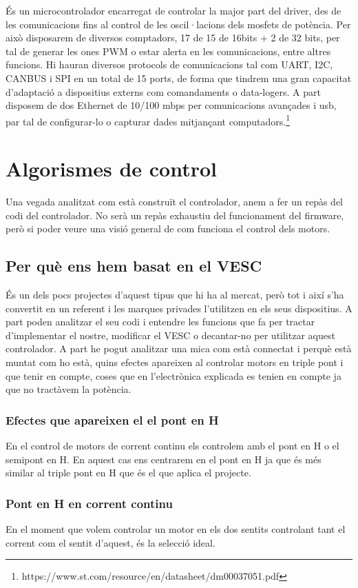 És un microcontrolador encarregat de controlar la major part del driver, des de les comunicacions fins al control de les oscil·lacions dels mosfets de potència. Per això disposarem de diversos comptadors, 17 de 15 de 16bits + 2 de 32 bits, per tal de generar les ones PWM o estar alerta en les comunicacions, entre altres funcions. Hi hauran diversos protocols de comunicacions tal com UART, I2C, CANBUS i SPI en un total de 15 ports, de forma que tindrem una gran capacitat d'adaptació a dispositius externs com comandaments o data-logers. A part disposem de dos Ethernet de 10/100 mbps per comunicacions avançades i usb, par tal de configurar-lo o capturar dades mitjançant computadors.\footnote{https://www.st.com/resource/en/datasheet/dm00037051.pdf}
     
\section{Algorismes de control}
Una vegada analitzat com està construït el controlador, anem a fer un repàs del codi del controlador. No serà un repàs exhaustiu del funcionament del firmware, però si poder veure una visió general de com funciona el control dels motors.
    
\subsection{Per què ens hem basat en el VESC}
És un dels pocs projectes d'aquest tipus que hi ha al mercat, però tot i així s'ha convertit en un referent i les marques privades l'utilitzen en els seus dispositius. A part poden analitzar el seu codi i entendre les funcions que fa per tractar d'implementar el nostre, modificar el VESC o decantar-no per utilitzar aquest controlador. A part he pogut analitzar una mica com està connectat i perquè està muntat com ho està, quins efectes apareixen al controlar motors en triple pont i que tenir en compte, coses que en l'electrònica explicada es tenien en compte ja que no tractàvem la potència.

\subsubsection{Efectes que apareixen el el pont en H}
En el control de motors de corrent continu els controlem amb el pont en H o el semipont en H. En aquest cas ens centrarem en el pont en H ja que és més similar al triple pont en H que és el que aplica el projecte.

\subsubsection{Pont en H en corrent continu}
En el moment que volem controlar un motor en els dos sentits controlant tant el corrent com el sentit d'aquest, és la selecció ideal.

